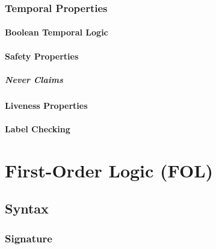 \documentclass[a4paper, 11pt, accentcolor = tud3b]{tudreport}
\begin{document}
			\subsection{Temporal Properties} %

				\subsubsection{Boolean Temporal Logic} %

				\subsubsection{Safety Properties} %

					\paragraph{Never Claims} %

				\subsubsection{Liveness Properties} %

				\subsubsection{Label Checking} %
		

	\chapter{First-Order Logic (FOL)} %

		\section{Syntax} %

			\subsection{Signature} %
\end{document}
